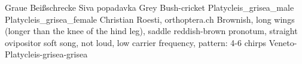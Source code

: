 {Graue Bei{\ss}schrecke} %
{Siva popadavka} %
{Grey Bush-cricket} %
{Platycleis_grisea_male} %
{} %
{Platycleis_grisea_female}  %
{Christian Roesti, orthoptera.ch} %
{Brownish, long wings (longer than the knee of the hind leg), saddle reddish-brown pronotum, straight ovipositor} %
{soft song, not loud, low carrier frequency, pattern: 4-6 chirps} %
{Veneto-Platycleis-grisea-grisea} %
{} %
